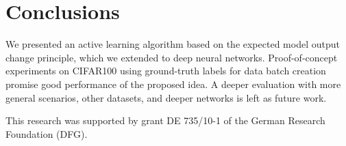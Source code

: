 \documentclass{article}
\begin{document}
\section{Conclusions}
We presented an active learning algorithm based on the expected model output change principle,
which we extended to deep neural networks.
Proof-of-concept experiments on CIFAR100 using ground-truth labels for data batch creation promise good performance of the proposed idea.
A deeper evaluation with more general scenarios, other datasets, and deeper networks is left as future work.

{
    \scriptsize
    This research was supported by grant DE 735/10-1 of the German Research Foundation (DFG).
}



\end{document}
